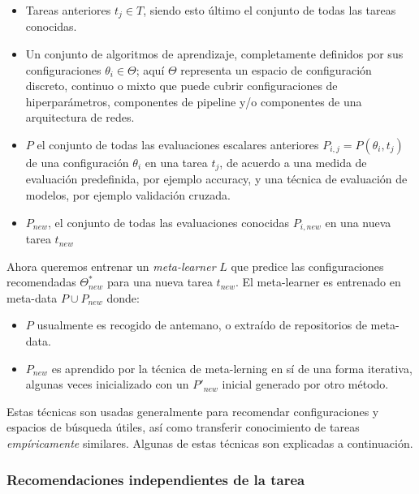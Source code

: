 \begin{itemize}
	\item Tareas anteriores $t_j \in T$, siendo esto último el conjunto de todas las tareas conocidas.
	\item Un conjunto de algoritmos de aprendizaje, completamente definidos por sus configuraciones $\theta_i \in \Theta$; aquí $\Theta$ representa un espacio de configuración discreto, continuo o mixto que puede cubrir configuraciones de hiperparámetros, componentes de pipeline y/o componentes de una arquitectura de redes.
	\item $P$ el conjunto de todas las evaluaciones escalares anteriores $P_{i,j} = P(\theta_i, t_j)$ de una configuración $\theta_i$ en una tarea $t_j$, de acuerdo a una medida de evaluación predefinida, por ejemplo accuracy, y una técnica de evaluación de modelos, por ejemplo validación cruzada. 
	\item $P_{new}$, el conjunto de todas las evaluaciones conocidas $P_{i, new}$ en una nueva tarea $t_{new}$ 
\end{itemize}

Ahora queremos entrenar un \emph{meta-learner} $L$ que predice las configuraciones recomendadas $\Theta^*_{new}$ para una nueva tarea $t_{new}$. El meta-learner es entrenado en meta-data $P\cup P_{new}$ donde:

\begin{itemize}
	\item $P$ usualmente es recogido de antemano, o extraído de repositorios de meta-data.
	\item $P_{new}$ es aprendido por la técnica de meta-lerning en sí de una forma iterativa, algunas veces inicializado con un $P'_{new}$ inicial generado por otro método.
\end{itemize}

Estas técnicas son usadas generalmente para recomendar configuraciones y espacios de búsqueda útiles, así como transferir conocimiento de tareas \textit{empíricamente} similares. Algunas de estas técnicas son explicadas a continuación. 

\subsubsection{Recomendaciones independientes de la tarea}

